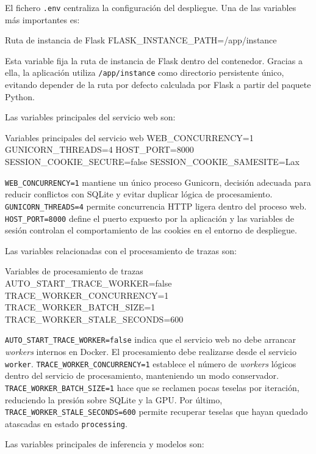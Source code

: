 El fichero \texttt{.env} centraliza la configuración del despliegue. Una de las variables más importantes es:

\begin{infocmdbox}{Ruta de instancia de Flask}
FLASK_INSTANCE_PATH=/app/instance
\end{infocmdbox}

Esta variable fija la ruta de instancia de Flask dentro del contenedor. Gracias a ella, la aplicación utiliza \texttt{/app/instance} como directorio persistente único, evitando depender de la ruta por defecto calculada por Flask a partir del paquete Python.

Las variables principales del servicio web son:

\begin{infocmdbox}{Variables principales del servicio web}
WEB_CONCURRENCY=1
GUNICORN_THREADS=4
HOST_PORT=8000
SESSION_COOKIE_SECURE=false
SESSION_COOKIE_SAMESITE=Lax
\end{infocmdbox}

\texttt{WEB\_CONCURRENCY=1} mantiene un único proceso Gunicorn, decisión adecuada para reducir conflictos con SQLite y evitar duplicar lógica de procesamiento. \texttt{GUNICORN\_THREADS=4} permite concurrencia HTTP ligera dentro del proceso web. \texttt{HOST\_PORT=8000} define el puerto expuesto por la aplicación y las variables de sesión controlan el comportamiento de las cookies en el entorno de despliegue.

Las variables relacionadas con el procesamiento de trazas son:

\begin{infocmdbox}{Variables de procesamiento de trazas}
AUTO_START_TRACE_WORKER=false
TRACE_WORKER_CONCURRENCY=1
TRACE_WORKER_BATCH_SIZE=1
TRACE_WORKER_STALE_SECONDS=600
\end{infocmdbox}

\texttt{AUTO\_START\_TRACE\_WORKER=false} indica que el servicio web no debe arrancar \textit{workers} internos en Docker. El procesamiento debe realizarse desde el servicio \texttt{worker}. \texttt{TRACE\_WORKER\_CONCURRENCY=1} establece el número de \textit{workers} lógicos dentro del servicio de procesamiento, manteniendo un modo conservador. \texttt{TRACE\_WORKER\_BATCH\_SIZE=1} hace que se reclamen pocas teselas por iteración, reduciendo la presión sobre SQLite y la GPU. Por último, \texttt{TRACE\_WORKER\_STALE\_SECONDS=600} permite recuperar teselas que hayan quedado atascadas en estado \texttt{processing}.

Las variables principales de inferencia y modelos son:

